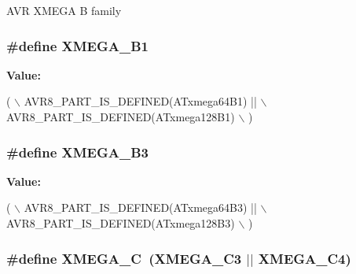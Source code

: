 A\-V\-R X\-M\-E\-G\-A B family \hypertarget{group__xmega__part__macros__group_gaa2fd55860a1bbc05c6d0d384e7476596}{
\subsubsection[{X\-M\-E\-G\-A\-\_\-\-B1}]{\setlength{\rightskip}{0pt plus 5cm}\#define X\-M\-E\-G\-A\-\_\-\-B1}}\label{group__xmega__part__macros__group_gaa2fd55860a1bbc05c6d0d384e7476596}
{\bfseries Value\-:}
\begin{DoxyCode}
( \(\backslash\)
        AVR8\_PART\_IS\_DEFINED(ATxmega64B1)  || \(\backslash\)
        AVR8\_PART\_IS\_DEFINED(ATxmega128B1) \(\backslash\)
        )
\end{DoxyCode}
\hypertarget{group__xmega__part__macros__group_ga7385be70af05a3a61864a4fc470fa39d}{
\subsubsection[{X\-M\-E\-G\-A\-\_\-\-B3}]{\setlength{\rightskip}{0pt plus 5cm}\#define X\-M\-E\-G\-A\-\_\-\-B3}}\label{group__xmega__part__macros__group_ga7385be70af05a3a61864a4fc470fa39d}
{\bfseries Value\-:}
\begin{DoxyCode}
( \(\backslash\)
        AVR8\_PART\_IS\_DEFINED(ATxmega64B3)  || \(\backslash\)
        AVR8\_PART\_IS\_DEFINED(ATxmega128B3) \(\backslash\)
        )
\end{DoxyCode}
\hypertarget{group__xmega__part__macros__group_ga75b06dd59d29b1de54dd73fe67830973}{
\subsubsection[{X\-M\-E\-G\-A\-\_\-\-C}]{\setlength{\rightskip}{0pt plus 5cm}\#define X\-M\-E\-G\-A\-\_\-\-C~({\bf X\-M\-E\-G\-A\-\_\-\-C3} $|$$|$ {\bf X\-M\-E\-G\-A\-\_\-\-C4})}}\label{group__xmega__part__macros__group_ga75b06dd59d29b1de54dd73fe67830973}
